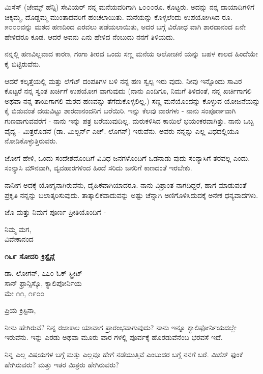 ಮಿಸೆಸ್ (ಜೇಮ್ಸ್ ಹೆನ್ಸಿ) ಸೇವಿಯರ್ ನನ್ನ ಮನೆಯವರಿಗಾಗಿ ೬೦೦೦ರೂ. ಕೊಟ್ಟರು. ಅದನ್ನು ನನ್ನ ದಾಯಾದಿಗಳಿಗೆ ಚಿಕ್ಕಮ್ಮ, ದೊಡ್ಡಮ್ಮ ಮುಂತಾದವರಿಗೆ ಹಂಚಲಾಯಿತು. ಮನೆಯನ್ನು ಕೊಳ್ಳಲೆಂದು ಉಪಯೋಗಿಸಿದ ರೂ. ೫೦೦೦ವನ್ನು ಮಠದ ಹಣದಿಂದ ಎರವಲು ಪಡೆಯಲಾಯಿತು, ಅದರ ಬಗ್ಗೆ ವಿರೋಧ ವಾಗಿ ಶಾರದಾನಂದ ಏನೇ ಹೇಳಿದರೂ ಕೂಡ. ಆದರೆ ಅವನು ಏನು ಹೇಳಿದ ನೆಂಬುದು ನನಗೆ ತಿಳಿಯದು.

ನನ್ನಲ್ಲಿ ಹಣವಿಲ್ಲವಾದ ಕಾರಣ, ಗಂಗಾ ತೀರದ ಒಂದು ಸಣ್ಣ ಮನೆಯ ಆಲೋಚನೆ ಯನ್ನು ಬಹಳ ಕಾಲದ ಹಿಂದೆಯೇ ಕೈ ಬಿಟ್ಟಿರುವೆನು.

ಆದರೆ ಕಲ್ಕತ್ತೆಯಲ್ಲಿ ಮತ್ತು ಲೆಗೆಟ್ ದಂಪತಿಗಳ ಬಳಿ ನನ್ನ ಹಣ ಸ್ವಲ್ಪ ಇರು ವುದು. ನೀವು ಇನ್ನೊಂದು ಸಾವಿರ ಕೊಟ್ಟರೆ ನನ್ನ ಸ್ವಂತ ಖರ್ಚಿಗೆ ಉಪಯೋಗ ವಾಗುವುದು (ನಾನು ಎಂದಿಗೂ, ನಿಮಗೆ ತಿಳಿದಂತೆ, ನನ್ನ ಖರ್ಚಿಗಾಗಲಿ ಅಥವಾ ನನ್ನ ತಾಯಿಗಾಗಲಿ ಮಠದ ಹಣವನ್ನು ತೆಗೆದುಕೊಳ್ಳಲಿಲ್ಲ.) ಸಣ್ಣ ಮನೆಯೊಂದನ್ನು ಕೊಳ್ಳುವ ಯೋಜನೆಯನ್ನು ಕೈ ಬಿಡುವಂತೆ ದಯವಿಟ್ಟು ಶಾರದಾನಂದನಿಗೆ ಬರೆಯಿರಿ. ಇನ್ನು ಕೆಲವು ವಾರಗಳು - ನಾನು ಸಂಪೂರ್ಣವಾಗಿ ಗುಣವಾಗುವವರೆಗೆ - ನಾನು ಇನ್ನು ಪತ್ರ ಬರೆಯುವುದಿಲ್ಲ. ಮರುಕಳಿಸಿದ ಕಾಯಿಲೆ ಭಯಂಕರವಾಗಿತ್ತು. ನಾನು ಒಬ್ಬ ವೈದ್ಯ - ಮಿತ್ರರೊಡನೆ (ಡಾ. ಮಿಲ್ಬರ್ನ್ ಎಚ್. ಲೊಗನ್) ಇರುವೆನು. ಅವರು ನನ್ನನ್ನು ಎಲ್ಲ ವಿಧದಲ್ಲಿಯೂ ನೋಡಿಕೊಳ್ಳುತ್ತಿರುವರು.

ಜೋಗೆ ಹೇಳಿ, ಒಂದು ಸಂದೇಶದೊಂದಿಗೆ ವಿವಿಧ ಜನಗಳೊಂದಿಗೆ ಒಡನಾಡು ವುದು ಸಂನ್ಯಾಸಿಗೆ ತರವಲ್ಲ ಎಂದು. ಸಂನ್ಯಾಸಿ ಮೌನವಾಗಿ, ವ್ಯವಹಾರಗಳಿಂದ ಹಿಂದೆ ಸರಿದು ಜನರಿಗೆ ಕಾಣದಂತೆ ಇರಬೇಕು.

ನಾನೀಗ ಅದಕ್ಕೆ ಯೋಗ್ಯನಾಗಿರುವೆನು, ದೈಹಿಕವಾಗಿಯಾದರೂ. ನಾನು ವಿಶ್ರಾಂತ ನಾಗದಿದ್ದರೆ, ಹಾಗೆ ಮಾಡುವಂತೆ ಪ್ರಕೃತಿ ನನ್ನನ್ನು ಬಲಾತ್ಕರಿಸುವುದು. ತಾತ್ಕಾಲಿಕವಾದುವನ್ನು ಅಷ್ಟು ಚೆನ್ನಾಗಿ ಅಣಿಗೊಳಿಸಿದುದಕ್ಕೆ ಅನೇಕ ಧನ್ಯವಾದಗಳು.

ಜೊ ಮತ್ತು ನಿಮಗೆ ಪೂರ್ಣ ಪ್ರೀತಿಯೊಂದಿಗೆ -

\begin{flushright}
ನಿಮ್ಮ ಮಗ,\\ವಿವೇಕಾನಂದ
\end{flushright}

\begin{center}
\textbf{೧೬೯ ಸೋದರಿ ಕ್ರಿಸ್ಟೈನ್ಗೆ}
\end{center}

\begin{flushright}
 ಡಾ. ಲೋಗನ್, ೭೭೦ ಓಕ್ ಸ್ಟ್ರೀಟ್\\ಸಾನ್ ಫ್ರಾನ್ಸಿಸ್ಕೊ, ಕ್ಯಾಲಿಪೋರ್ನಿಯ\\ಮೇ ೧೧, ೧೯೦೦
\end{flushright}

ಪ್ರಿಯ ಕ್ರಿಸ್ಟಿನಾ,

ನೀನು ಹೇಗಿರುವೆ? ನಿನ್ನ ರಜಾಕಾಲ ಯಾವಾಗ ಪ್ರಾರಂಭವಾಗುವುದು? ನಾನು ಇನ್ನೂ ಕ್ಯಾಲಿಫೋರ್ನಿಯದಲ್ಲೇ ಇರುವೆನು. ಇನ್ನು ಎರಡು ಅಥವಾ ಮೂರು ವಾರ ಗಳಲ್ಲಿ ಪೂರ್ವಕ್ಕೆ ಹೊರಡುವೆನೆಂಬ ಭರವಸೆ ಇದೆ.

ನಿನ್ನ ಎಲ್ಲ ವಿಷಯಗಳ ಬಗ್ಗೆ ಮತ್ತು ಎಲ್ಲವೂ ಹೇಗೆ ನಡೆಯುತ್ತಿವೆ ಎಂಬುದರ ಬಗ್ಗೆ ನನಗೆ ಬರೆ. ಮಿಸೆಸ್ ಫುಂಕೆ ಹೇಗಿರುವರು? ಮತ್ತು ಇತರ ಮಿತ್ರರು ಹೇಗಿರುವರು?

